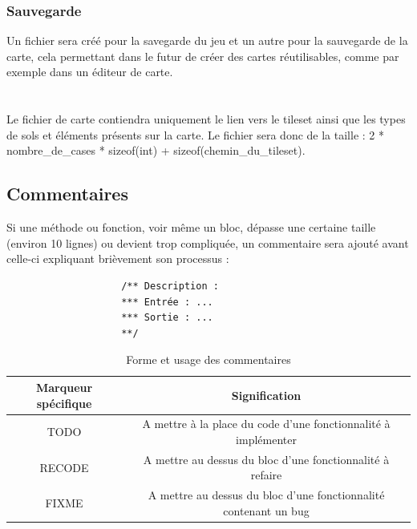 \documentclass[a4paper]{memoir}
\begin{document}
				\subsubsection{Sauvegarde}
					Un fichier sera créé pour la savegarde du jeu et un autre pour la sauvegarde de la carte, cela permettant dans le futur de créer des cartes réutilisables, comme par exemple dans un éditeur de carte.\\
					\\
					\\
					Le fichier de carte contiendra uniquement le lien vers le tileset ainsi que les types de sols et éléments présents sur la carte. Le fichier sera donc de la taille : 2 * nombre\_de\_cases * sizeof(int) + sizeof(chemin\_du\_tileset).\\
			
			\subsection{Commentaires}
				Si une méthode ou fonction, voir même un bloc, dépasse une certaine taille (environ 10 lignes) ou devient trop compliquée, un commentaire sera ajouté avant celle-ci expliquant brièvement son processus :
				\begin{verbatim}
					/** Description :
					*** Entrée : ...
					*** Sortie : ...
					**/
				\end{verbatim}
				\begin{table}[H]
					\begin{small}
						\begin{tabular}{| c | c |}
							\hline
							\textbf{Marqueur spécifique} & \textbf{Signification}\\
							\hline
							TODO & A mettre à la place du code d'une fonctionnalité à implémenter\\
							\hline
							RECODE & A mettre au dessus du bloc d'une fonctionnalité à refaire\\
							\hline
							FIXME & A mettre au dessus du bloc d'une fonctionnalité contenant un bug\\
							\hline
						\end{tabular}
					\end{small}
					\label{tab:commentaire}
					\caption{Forme et usage des commentaires}
				\end{table}
\end{document}
